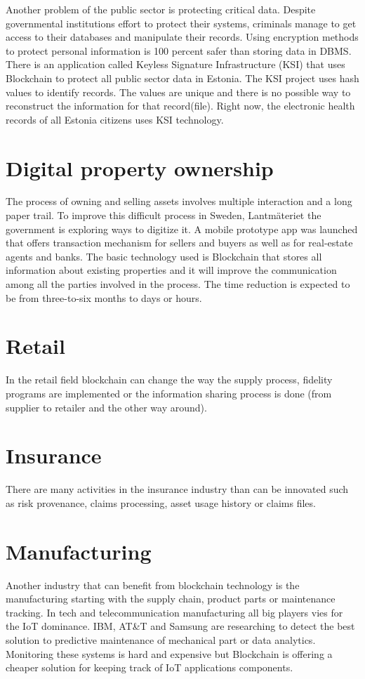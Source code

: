 Another problem of the public sector is protecting critical data. Despite governmental institutions effort to protect their systems, criminals manage to get access to their databases and manipulate their records.
Using encryption methods to protect personal information is 100 percent safer than storing data in DBMS.
There is an application called Keyless Signature Infrastructure (KSI) that uses Blockchain to protect all public sector data in Estonia. The KSI project uses hash values to identify records. The values are unique and there is no possible way to reconstruct the information for that record(file).
Right now, the electronic health records of all Estonia citizens uses KSI technology.

\section{Digital property ownership}
The process of owning and selling assets involves multiple interaction and a long paper trail. To improve this difficult process in Sweden, Lantmäteriet the government is exploring ways to digitize it. A mobile prototype app was launched that offers transaction mechanism for sellers and buyers as well as for real-estate agents and banks. The basic technology used is Blockchain that stores all information about existing properties and it will improve the communication among all the parties involved in the process. The time reduction is expected to be from three-to-six months to days or hours.
\section{Retail}
\label{sub-sec:chapter2-subsection3}
In the retail field blockchain can change the way the supply process, fidelity
programs are implemented or the information sharing process is done (from
supplier to retailer and the other way around).

\section{Insurance}
\label{sub-sec:chapter2-subsection4}
There are many activities in the insurance industry than can be innovated such as risk provenance, claims processing, asset usage history or claims files.

\section{Manufacturing}
\label{sub-sec:chapter2-subsection5}
Another industry that can benefit from blockchain technology is the manufacturing starting with the supply chain, product parts or maintenance tracking.
In tech and telecommunication manufacturing all big players vies for the IoT dominance. IBM, AT\&T and Samsung are researching to detect the best solution to predictive maintenance of mechanical part or data analytics. Monitoring these systems is hard and expensive but Blockchain is offering a cheaper solution for keeping track of IoT applications components.

